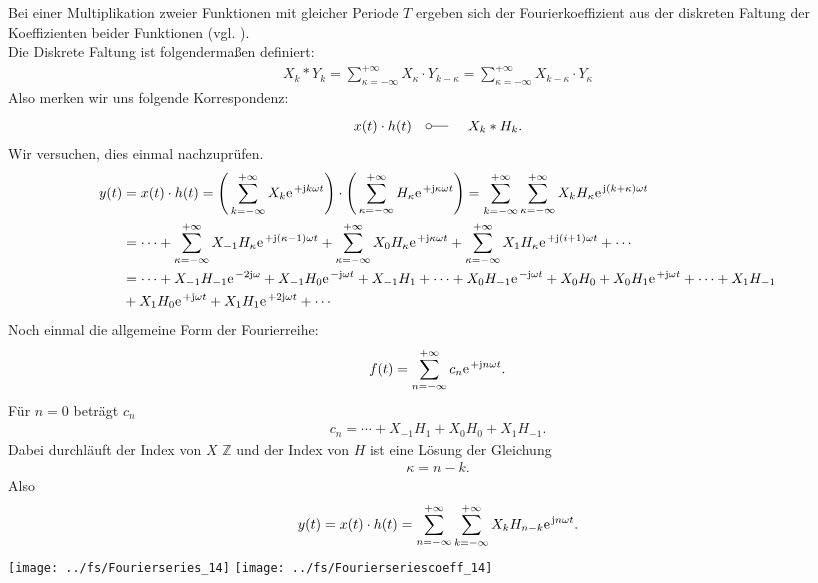 \documentclass[11pt,a4paper,DIV=12]{scrartcl}
\begin{document}
Bei einer Multiplikation zweier Funktionen mit gleicher Periode $T$ ergeben sich der Fourierkoeffizient aus der diskreten Faltung der Koeffizienten beider Funktionen (vgl. \cite[Kap. 3, S. 208]{Oppenheim1997}).\\
Die Diskrete Faltung ist folgendermaßen definiert:
\begin{align}
	X_k\ast Y_k=\sum_{\kappa = -\infty}^{+\infty}X_{\kappa}\cdot Y_{k-\kappa}=\sum_{\kappa =-\infty}^{+\infty}X_{k-\kappa}\cdot Y_{\kappa }
\end{align}
Also merken wir uns folgende Korrespondenz:
\begin{align}
	x(t)\cdot h(t)\quad\fourier\quad X_k \ast H_k.
\end{align}
Wir versuchen, dies einmal nachzuprüfen.
\begin{align}
	y(t)&=x(t)\cdot h(t)=\Bigg (\sum_{k=-\infty}^{+\infty}X_k\e^{+\im k \omega t}\Bigg )\cdot\Bigg ( \sum_{\kappa=-\infty}^{+\infty}H_{\kappa}\e^{+\im \kappa \omega t}\Bigg )=\sum_{k=-\infty}^{+\infty}\sum_{\kappa=-\infty}^{+\infty}X_kH_{\kappa}\e^{\im (k+\kappa)\omega t}\nonumber \\
	&=\cdots +\sum_{\kappa=-\infty}^{+\infty}X_{-1}H_{\kappa}\e^{+\im(\kappa-1)\omega t}+\sum_{\kappa=-\infty}^{+\infty}X_0H_{\kappa}\e^{+\im \kappa \omega t}+\sum_{\kappa=-\infty}^{+\infty}X_1H_{\kappa}\e^{+\im(i+1)\omega t}+\cdots\nonumber \\
	&=\cdots+X_{-1}H_{-1}\e^{-2\im \omega }+X_{-1}H_0\e^{-\im \omega t}+X_{-1}H_1+\cdots+X_0H_{-1}\e^{-\im \omega t}+X_0H_0+X_0H_1\e^{+\im  \omega t}+\cdots +X_1H_{-1}\nonumber \\
	&+X_1H_0\e^{+\im \omega t}+X_1H_1\e^{+2\im \omega t}+\cdots
\end{align}
Noch einmal die allgemeine Form der Fourierreihe:
\begin{align}
	f(t)=\sum_{n=-\infty}^{+\infty}c_n\e^{+\im n \omega t}.
\end{align}
Für $n=0$ beträgt $c_n$
\begin{align}
	c_n=\cdots + X_{-1}H_{1}+X_0H_0+X_1H_{-1}.
\end{align}
Dabei durchläuft der Index von $X$ $\mathbb{Z}$ und der Index von $H$ ist eine Lösung der Gleichung
\begin{align}
	\kappa = n-k.
\end{align}
Also
\begin{align}
	y(t)=x(t)\cdot h(t)=\sum_{n=-\infty}^{+\infty}\sum_{k=-\infty}^{+\infty}X_kH_{n-k}\e^{\im n \omega t}.
\end{align}
\newpage
\texttt{[image: ../fs/Fourierseries\_14]}
\texttt{[image: ../fs/Fourierseriescoeff\_14]}
\newpage
\end{document}
